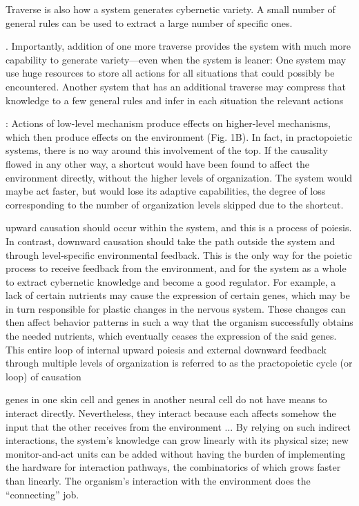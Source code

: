 \documentclass[10pt,a4paper]{article}
\begin{document}
Traverse is also how a system generates cybernetic variety. A
small number of general rules can be used to extract a large
number of specific ones.


. Importantly, addition of one more traverse provides the
system with much more capability to generate variety—even when the
system is leaner: One system may use huge resources to store all actions for all situations that could possibly be encountered. Another system
that has an additional traverse may compress that knowledge to a few
general rules and infer in each situation the relevant actions



: Actions of low-level
mechanism produce effects on higher-level mechanisms, which then
produce effects on the environment (Fig. 1B). In fact, in practopoietic
systems, there is no way around this involvement of the top. If the
causality flowed in any other way, a shortcut would have been found
to affect the environment directly, without the higher levels of
organization. The system would maybe act faster, but would lose
its adaptive capabilities, the degree of loss corresponding to the
number of organization levels skipped due to the shortcut.


upward causation should occur
within the system, and this is a process of poiesis. In contrast,
downward causation should take the path outside the system and
through level-specific environmental feedback. This is the only way for
the poietic process to receive feedback from the environment, and for
the system as a whole to extract cybernetic knowledge and become a
good regulator. For example, a lack of certain nutrients may cause the
expression of certain genes, which may be in turn responsible for
plastic changes in the nervous system. These changes can then affect
behavior patterns in such a way that the organism successfully
obtains the needed nutrients, which eventually ceases the expression
of the said genes. This entire loop of internal upward poiesis and
external downward feedback through multiple levels of organization
is referred to as the practopoietic cycle (or loop) of causation

genes in one skin cell and genes in another neural cell do
not have means to interact directly. Nevertheless, they interact because
each affects somehow the input that the other receives from the
environment ...
 By relying on such indirect
interactions, the system’s knowledge can grow linearly with its physical
size; new monitor-and-act units can be added without having the
burden of implementing the hardware for interaction pathways, the
combinatorics of which grows faster than linearly. The organism’s
interaction with the environment does the “connecting” job.
\end{document}
